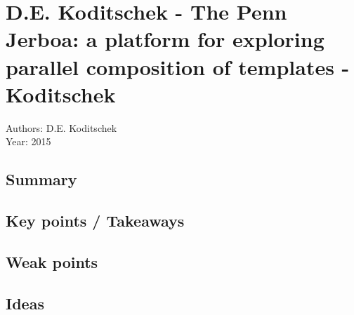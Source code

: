\section{D.E. Koditschek - The Penn Jerboa: a platform for exploring parallel composition of templates - Koditschek}
Authors: D.E. Koditschek\\
Year: 2015
\subsection*{Summary}
\subsection*{Key points / Takeaways}
\subsection*{Weak points}
\subsection*{Ideas}

